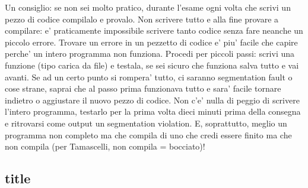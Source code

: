 Un consiglio: se non sei molto pratico, durante l'esame ogni volta che scrivi un pezzo di codice compilalo e provalo. Non scrivere tutto e alla fine provare a compilare: e' praticamente impossibile scrivere tanto codice senza fare neanche un piccolo errore. Trovare un errore in un pezzetto di codice e' piu' facile che capire perche' un intero programma non funziona. 
Procedi per piccoli passi: scrivi una funzione (tipo carica da file) e testala, se sei sicuro che funziona salva tutto e vai avanti. Se ad un certo punto si rompera' tutto, ci saranno segmentation fault o cose strane, saprai che al passo prima funzionava tutto e sara' facile tornare indietro o aggiustare il nuovo pezzo di codice. 
Non c'e' nulla di peggio di scrivere l'intero programma, testarlo per la prima volta dieci minuti prima della consegna e ritrovarsi come output un segmentation violation.
E, soprattutto, meglio un programma non completo ma che compila di uno che credi essere finito ma che non compila (per Tamascelli, non compila = bocciato)!
\subsection{title}